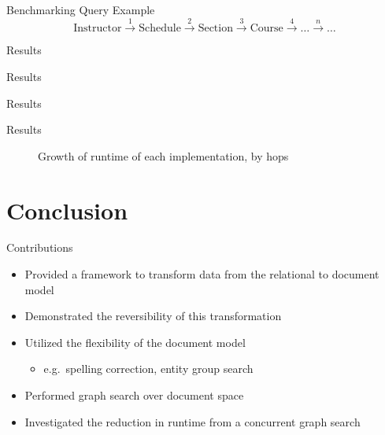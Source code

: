 \documentclass[compress]{beamer}
\begin{document}
		\begin{frame}{Benchmarking Query Example}
			\[
				\text{Instructor} \xrightarrow{1} \text{Schedule} \xrightarrow{2} \text{Section} \xrightarrow{3} \text{Course} \xrightarrow{4} \ldots \xrightarrow{n} \ldots
			\]
		\end{frame}
		
		\begin{frame}{Results}
			\begin{figure}
				\centering
				
			\end{figure}
		\end{frame}
		
		\begin{frame}{Results}
			\begin{figure}
				\centering
				
			\end{figure}
		\end{frame}
		
		\begin{frame}{Results}
			\begin{figure}
				\centering
				
			\end{figure}
		\end{frame}
		
		\begin{frame}{Results}
			\begin{figure}
				\centering
				
				\caption{Growth of runtime of each implementation, by hops}
			\end{figure}
		\end{frame}
	
	\section{Conclusion}
		\begin{frame}{Contributions}
			\begin{itemize}
				\item Provided a framework to transform data from the relational to document model
				\item Demonstrated the reversibility of this transformation
				\item Utilized the flexibility of the document model
					\begin{itemize}
						\item e.g.~spelling correction, entity group search
					\end{itemize}
				\item Performed graph search over document space
				\item Investigated the reduction in runtime from a concurrent graph search
			\end{itemize}
		\end{frame}
		
\end{document}
